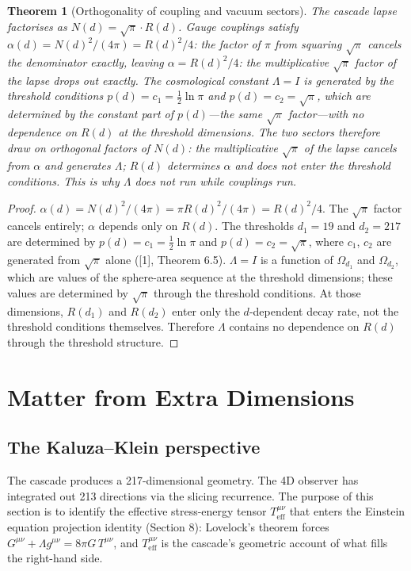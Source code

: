 \documentclass[12pt,a4paper]{article}
\newtheorem{theorem}{Theorem}[section]
\begin{document}
\begin{theorem}[Orthogonality of coupling and vacuum sectors]
The cascade lapse factorises
as $N(d) = \sqrt{\pi} \cdot R(d)$. Gauge couplings satisfy $\alpha(d) = N(d)^2/(4\pi) = R(d)^2/4$: the
factor of $\pi$ from squaring $\sqrt{\pi}$ cancels the denominator exactly, leaving $\alpha = R(d)^2/4$: the
multiplicative $\sqrt{\pi}$ factor of the lapse drops out exactly. The cosmological constant $\Lambda = I$ is
generated by the threshold conditions $p(d) = c_1 = \tfrac{1}{2}\ln\pi$ and $p(d) = c_2 = \sqrt{\pi}$, which are
determined by the constant part of $p(d)$---the same $\sqrt{\pi}$ factor---with no dependence on $R(d)$
at the threshold dimensions. The two sectors therefore draw on orthogonal factors of $N(d)$:
the multiplicative $\sqrt{\pi}$ of the lapse cancels from $\alpha$ and generates $\Lambda$; $R(d)$ determines $\alpha$ and
does not enter the threshold conditions. This is why $\Lambda$ does not run while couplings run.
\end{theorem}

\begin{proof}
$\alpha(d) = N(d)^2/(4\pi) = \pi R(d)^2/(4\pi) = R(d)^2/4$. The $\sqrt{\pi}$ factor cancels entirely;
$\alpha$ depends only on $R(d)$. The thresholds $d_1 = 19$ and $d_2 = 217$ are determined by
$p(d) = c_1 = \tfrac{1}{2}\ln\pi$ and $p(d) = c_2 = \sqrt{\pi}$, where $c_1$, $c_2$ are generated from $\sqrt{\pi}$ alone ([1],
Theorem 6.5). $\Lambda = I$ is a function of $\Omega_{d_1}$ and $\Omega_{d_2}$, which are values of the sphere-area
sequence at the threshold dimensions; these values are determined by $\sqrt{\pi}$ through the
threshold conditions. At those dimensions, $R(d_1)$ and $R(d_2)$ enter only the $d$-dependent
decay rate, not the threshold conditions themselves. Therefore $\Lambda$ contains no dependence
on $R(d)$ through the threshold structure.
\end{proof}

\section{Matter from Extra Dimensions}

\subsection{The Kaluza--Klein perspective}

The cascade produces a 217-dimensional geometry. The 4D observer has integrated out
213 directions via the slicing recurrence. The purpose of this section is to identify the
effective stress-energy tensor $T^{\mu\nu}_{\text{eff}}$ that enters the Einstein equation projection identity
(Section 8): Lovelock's theorem forces $G^{\mu\nu} + \Lambda g^{\mu\nu} = 8\pi G\,T^{\mu\nu}$, and $T^{\mu\nu}_{\text{eff}}$ is the cascade's
geometric account of what fills the right-hand side.
\end{document}
